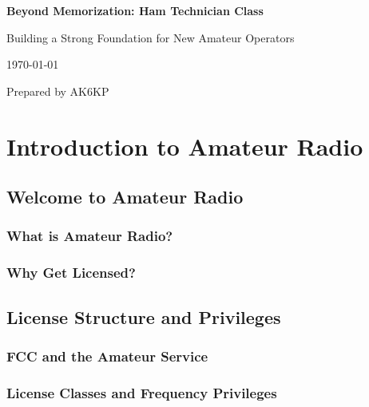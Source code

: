 \documentclass[12pt]{book}
\begin{document}
\begin{titlepage}
    \centering
    \vspace*{2cm}    
    {\Huge\bfseries Beyond Memorization: Ham Technician Class\par}
    \vspace{2cm}    
    {\Large Building a Strong Foundation for New Amateur Operators\par}
    
    \vspace{3cm}
    
    {\large\today\par}
    
    \vfill
    
    {\large Prepared by AK6KP\par}
\end{titlepage}

\cleardoublepage

\tableofcontents
\newpage
\part{Introduction to Amateur Radio}
\chapter{Welcome to Amateur Radio}
\section{What is Amateur Radio?}


\section{Why Get Licensed?}

\chapter{License Structure and Privileges}
\section{FCC and the Amateur Service}

\section{License Classes and Frequency Privileges}


\end{document}
